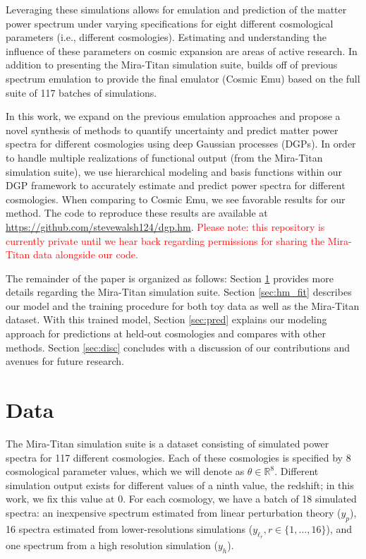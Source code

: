 \documentclass[11pt]{article}
\begin{document}
Leveraging these simulations allows for emulation and prediction of the matter power spectrum under varying specifications for eight different cosmological parameters (i.e., different cosmologies). Estimating and understanding the influence of these parameters on cosmic expansion are areas of active research. In addition to presenting the Mira-Titan simulation suite, \cite{moran2023mira} builds off of previous spectrum emulation \citep{lawrence2017mira} to provide the final emulator (Cosmic Emu) based on the full suite of 117 batches of simulations. 

In this work, we expand on the previous emulation approaches and propose a novel synthesis of methods to quantify uncertainty and predict matter power spectra for different cosmologies using deep Gaussian processes (DGPs). In order to handle multiple realizations of functional output (from the Mira-Titan simulation suite), we use hierarchical modeling and basis functions within our DGP framework to accurately estimate and predict power spectra for different cosmologies. When comparing to Cosmic Emu, we see favorable results for our method. The code to reproduce these results are available at \url{https://github.com/stevewalsh124/dgp.hm}. \textcolor{red}{Please note: this repository is currently private until we hear back regarding permissions for sharing the Mira-Titan data alongside our code.}

The remainder of the paper is organized as follows: Section \ref{sec:data} provides more details regarding the Mira-Titan simulation suite. Section \ref{sec:hm_fit} describes our model and the training procedure for both toy data as well as the Mira-Titan dataset. With this trained model, Section \ref{sec:pred} explains our modeling approach for predictions at held-out cosmologies and compares with other methods. Section \ref{sec:disc} concludes with a discussion of our contributions and avenues for future research.

\section{Data}
\label{sec:data}

The Mira-Titan simulation suite is a dataset consisting of simulated power spectra for 117 different cosmologies. Each of these cosmologies is specified by 8 cosmological parameter values, which we will denote as $\theta \in \mathbb{R}^8$. Different simulation output exists for different values of a ninth value, the redshift; in this work, we fix this value at 0. For each cosmology, we have a batch of 18 simulated spectra: an inexpensive spectrum estimated from linear perturbation theory ($y_p$), 16 spectra estimated from lower-resolutions simulations ($y_{\ell_r}, r \in \{1,\dots,16\}$), and one spectrum from a high resolution simulation ($y_h$). 
\end{document}
